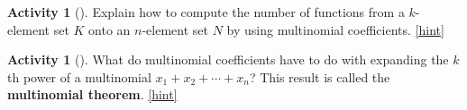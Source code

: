 \documentclass[10pt,]{book}
\newcommand{\terminology}[1]{\textbf{#1}}
\theoremstyle{plain}
\theoremstyle{definition}
\theoremstyle{definition}
\theoremstyle{definition}
\newtheorem{activity}[project]{Activity}
\numberwithin{equation}{chapter}
\begin{document}
\begin{activity}[]\label{activity-276}
\hypertarget{p-1434}{}%
Explain how to compute the number of functions from a \(k\)-element set \(K\) onto an \(n\)-element set \(N\) by using multinomial coefficients.%
\hfill{\tiny\hyperlink{a-283}{[hint]}\hypertarget{q-283}{}}\end{activity}
\begin{activity}[]\label{activity-277}
\hypertarget{p-1437}{}%
What do multinomial coefficients have to do with expanding the \(k\)th power of a multinomial \(x_1+x_2+\cdots+x_n\)? This result is called the \terminology{multinomial theorem}.%
\hfill{\tiny\hyperlink{a-284}{[hint]}\hypertarget{q-284}{}}\end{activity}
\typeout{************************************************}
\typeout{************************************************}
\end{document}
